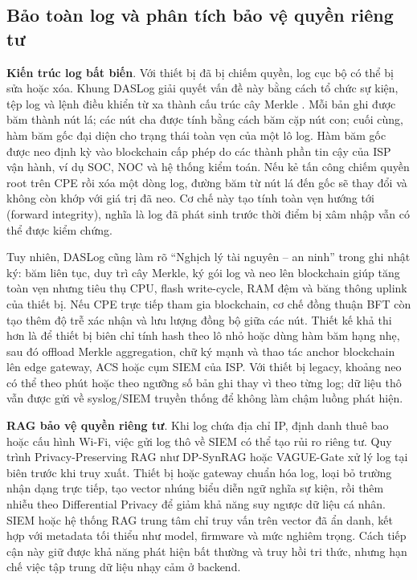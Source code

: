\documentclass[../DoAn.tex]{subfiles}
\begin{document}
\subsection{Bảo toàn log và phân tích bảo vệ quyền riêng tư}
\textbf{Kiến trúc log bất biến}. Với thiết bị đã bị chiếm quyền, log cục bộ có thể bị sửa hoặc xóa. Khung DASLog giải quyết vấn đề này bằng cách tổ chức sự kiện, tệp log và lệnh điều khiển từ xa thành cấu trúc cây Merkle \cite{logaudit2023}. Mỗi bản ghi được băm thành nút lá; các nút cha được tính bằng cách băm cặp nút con; cuối cùng, hàm băm gốc đại diện cho trạng thái toàn vẹn của một lô log. Hàm băm gốc được neo định kỳ vào blockchain cấp phép do các thành phần tin cậy của ISP vận hành, ví dụ SOC, NOC và hệ thống kiểm toán. Nếu kẻ tấn công chiếm quyền root trên CPE rồi xóa một dòng log, đường băm từ nút lá đến gốc sẽ thay đổi và không còn khớp với giá trị đã neo. Cơ chế này tạo tính toàn vẹn hướng tới (forward integrity), nghĩa là log đã phát sinh trước thời điểm bị xâm nhập vẫn có thể được kiểm chứng.

Tuy nhiên, DASLog cũng làm rõ ``Nghịch lý tài nguyên -- an ninh'' trong ghi nhật ký: băm liên tục, duy trì cây Merkle, ký gói log và neo lên blockchain giúp tăng toàn vẹn nhưng tiêu thụ CPU, flash write-cycle, RAM đệm và băng thông uplink của thiết bị. Nếu CPE trực tiếp tham gia blockchain, cơ chế đồng thuận BFT còn tạo thêm độ trễ xác nhận và lưu lượng đồng bộ giữa các nút. Thiết kế khả thi hơn là để thiết bị biên chỉ tính hash theo lô nhỏ hoặc dùng hàm băm hạng nhẹ, sau đó offload Merkle aggregation, chữ ký mạnh và thao tác anchor blockchain lên edge gateway, ACS hoặc cụm SIEM của ISP. Với thiết bị legacy, khoảng neo có thể theo phút hoặc theo ngưỡng số bản ghi thay vì theo từng log; dữ liệu thô vẫn được gửi về syslog/SIEM truyền thống để không làm chậm luồng phát hiện.

\textbf{RAG bảo vệ quyền riêng tư}. Khi log chứa địa chỉ IP, định danh thuê bao hoặc cấu hình Wi-Fi, việc gửi log thô về SIEM có thể tạo rủi ro riêng tư. Quy trình Privacy-Preserving RAG như DP-SynRAG hoặc VAGUE-Gate xử lý log tại biên trước khi truy xuất. Thiết bị hoặc gateway chuẩn hóa log, loại bỏ trường nhận dạng trực tiếp, tạo vector nhúng biểu diễn ngữ nghĩa sự kiện, rồi thêm nhiễu theo Differential Privacy để giảm khả năng suy ngược dữ liệu cá nhân. SIEM hoặc hệ thống RAG trung tâm chỉ truy vấn trên vector đã ẩn danh, kết hợp với metadata tối thiểu như model, firmware và mức nghiêm trọng. Cách tiếp cận này giữ được khả năng phát hiện bất thường và truy hồi tri thức, nhưng hạn chế việc tập trung dữ liệu nhạy cảm ở backend.
\end{document}
